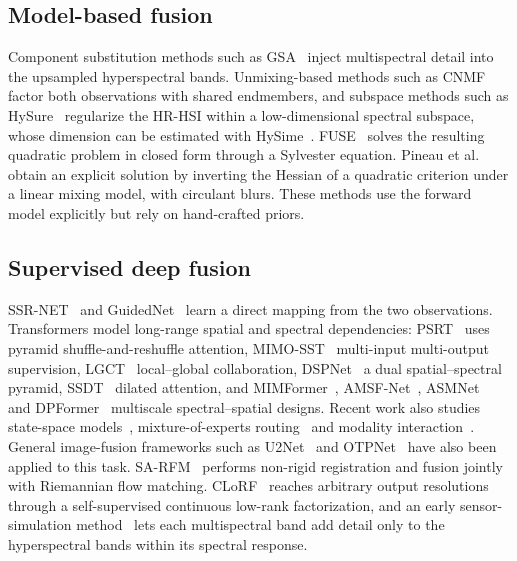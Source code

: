 \documentclass[journal]{IEEEtran}
\begin{document}
\subsection{Model-based fusion}
Component substitution methods such as GSA~\cite{aiazzi2007gsa} inject multispectral detail into the upsampled hyperspectral bands. Unmixing-based methods such as CNMF~\cite{yokoya2012cnmf} factor both observations with shared endmembers, and subspace methods such as HySure~\cite{simoes2015hysure} regularize the HR-HSI within a low-dimensional spectral subspace, whose dimension can be estimated with HySime~\cite{bioucas2008hysime}. FUSE~\cite{wei2015fuse} solves the resulting quadratic problem in closed form through a Sylvester equation. Pineau et al.~\cite{pineau2023exact} obtain an explicit solution by inverting the Hessian of a quadratic criterion under a linear mixing model, with circulant blurs. These methods use the forward model explicitly but rely on hand-crafted priors.

\subsection{Supervised deep fusion}
SSR-NET~\cite{zhang2021ssrnet} and GuidedNet~\cite{ran2023guidednet} learn a direct mapping from the two observations. Transformers model long-range spatial and spectral dependencies: PSRT~\cite{deng2023psrt} uses pyramid shuffle-and-reshuffle attention, MIMO-SST~\cite{fang2024mimosst} multi-input multi-output supervision, LGCT~\cite{he2024lgct} local--global collaboration, DSPNet~\cite{shan2023dspnet} a dual spatial--spectral pyramid, SSDT~\cite{fu2025ssdt} dilated attention, and MIMFormer~\cite{li2024mimformer}, AMSF-Net~\cite{liu2025amsf}, ASMNet~\cite{liu2025asmnet} and DPFormer~\cite{liu2026dpformer} multiscale spectral--spatial designs. Recent work also studies state-space models~\cite{peng2024fusionmamba,huang2026hdgmamba}, mixture-of-experts routing~\cite{xiao2026ramoe} and modality interaction~\cite{huo2026mian}. General image-fusion frameworks such as U2Net~\cite{peng2023u2net} and OTPNet~\cite{yu2025otpnet} have also been applied to this task. SA-RFM~\cite{zhang2026sarfm} performs non-rigid registration and fusion jointly with Riemannian flow matching. CLoRF~\cite{wang2025clorf} reaches arbitrary output resolutions through a self-supervised continuous low-rank factorization, and an early sensor-simulation method~\cite{khandelwal2011hyssvd} lets each multispectral band add detail only to the hyperspectral bands within its spectral response.
\end{document}
